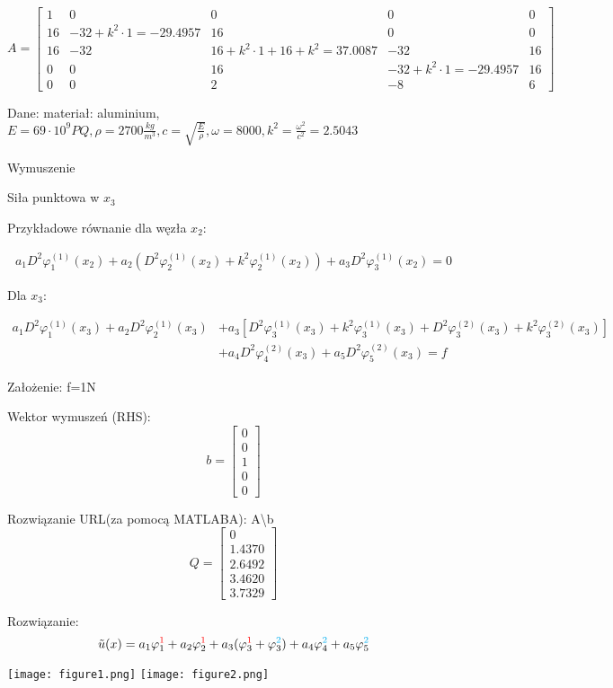 \documentclass[9pt, a4paper]{article}
\begin{document}
\[A=
\begin{bmatrix}
1&0&0&0&0\\
16&-32+k^2\cdot1=-29.4957&16&0&0\\
16&-32&16+k^2\cdot1+16+k^2=37.0087&-32&16\\
0&0&16&-32+k^2\cdot1=-29.4957&16\\
0&0&2&-8&6
\end{bmatrix}
\]

Dane: materiał: aluminium, \(E=69\cdot10^9PQ, \rho=2700\frac{kg}{m^3}, c=\sqrt{\frac{E}{\rho}}, \omega=8000, k^2=\frac{\omega^2}{c^2}=2.5043\)

\hfill \break

Wymuszenie

Siła punktowa w $x_3$

Przykładowe równanie dla węzła $x_2$:

\begin{align*}
a_1D^2\varphi_1^{(1)}(x_2)+a_2(D^2\varphi_2^{(1)}(x_2)+k^2\varphi_2^{(1)}(x_2))+a_3D^2\varphi_3^{(1)}(x_2)=0
\end{align*}

Dla $x_3$:

\begin{align*}
a_1D^2\varphi_1^{(1)}(x_3)+a_2D^2\varphi_2^{(1)}(x_3)&+a_3[D^2\varphi_3^{(1)}(x_3)+k^2\varphi_3^{(1)}(x_3)+D^2\varphi_3^{(2)}(x_3)+k^2\varphi_3^{(2)}(x_3)]\\
&+a_4D^2\varphi_4^{(2)}(x_3)+a_5D^2\varphi_5^{(2)}(x_3)=f
\end{align*}

Założenie: f=1N

Wektor wymuszeń (RHS):
\[b=
\begin{bmatrix}
0\\0\\1\\0\\0
\end{bmatrix}
\]

Rozwiązanie URL(za pomocą MATLABA): A\textbackslash b
\[Q=
\begin{bmatrix}
0\\1.4370\\2.6492\\3.4620\\3.7329
\end{bmatrix}
\]

Rozwiązanie:
\[\tilde{u}(x)=a_1\varphi_1^{\textcolor{red}{1}}+a_2\varphi_2^{\textcolor{red}{1}}+a_3(\varphi_{3}^{\textcolor{red}{1}}+\varphi_3^{\textcolor{cyan}{2}})+a_4\varphi_4^{\textcolor{cyan}{2}}+a_5\varphi_5^{\textcolor{cyan}{2}}\]

\begin{center}
\texttt{[image: figure1.png]}
\texttt{[image: figure2.png]}
\end{center}
\end{document}
